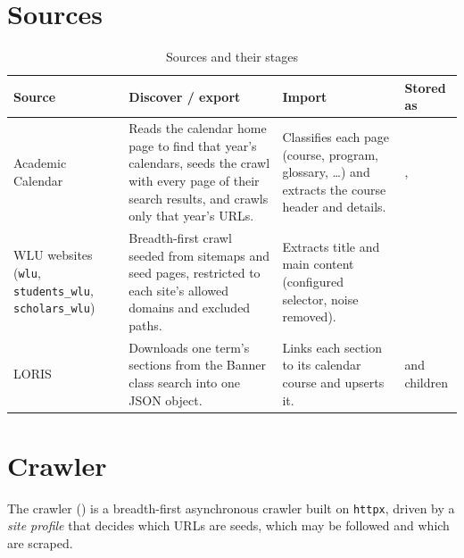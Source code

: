 \documentclass[11pt,letterpaper]{report}
\begin{document}
\section{Sources}
\begin{table}[H]
\centering
\caption{Sources and their stages}\label{tab:sources}
\begin{tabularx}{\textwidth}{@{}P{2.6cm}LLP{3.0cm}@{}}
\toprule
\textbf{Source} & \textbf{Discover / export} & \textbf{Import} & \textbf{Stored as} \\
\midrule
Academic Calendar & Reads the calendar home page to find that year's calendars, seeds the crawl with every page of their search results, and crawls only that year's URLs. & Classifies each page (course, program, glossary, \ldots) and extracts the course header and details. & ,  \\
WLU websites (\texttt{wlu}, \texttt{students\_wlu}, \texttt{scholars\_wlu}) & Breadth-first crawl seeded from sitemaps and seed pages, restricted to each site's allowed domains and excluded paths. & Extracts title and main content (configured selector, noise removed). &  \\
LORIS & Downloads one term's sections from the Banner class search into one JSON object. & Links each section to its calendar course and upserts it. &  and children \\
\bottomrule
\end{tabularx}
\end{table}

\section{Crawler}
The crawler () is a breadth-first asynchronous crawler
built on \texttt{httpx}, driven by a \emph{site profile} that decides which URLs are seeds, which may be
followed and which are scraped.
\end{document}
